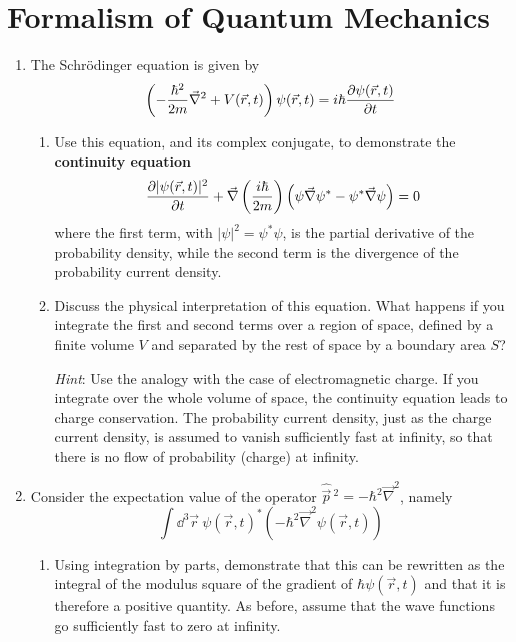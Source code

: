 \documentclass[../psets.tex]{subfiles}
\begin{document}
\section{Formalism of Quantum Mechanics}
\begin{enumerate}
    \item {}The Schr\"{o}dinger equation is given by
    \begin{equation*}
        \left( -\frac{\hbar^2}{2m}\vec{\nabla}^2+V(\vec{r},t) \right)\psi(\vec{r},t) = i\hbar\pdv{\psi(\vec{r},t)}{t}
    \end{equation*}
    \begin{enumerate}
        \item Use this equation, and its complex conjugate, to demonstrate the \textbf{continuity equation}
        \begin{equation*}
            \pdv{|\psi(\vec{r},t)|^2}{t}+\vec{\nabla}\left( \frac{i\hbar}{2m} \right)\left( \psi\vec{\nabla}\psi^*-\psi^*\vec{\nabla}\psi \right) = 0
        \end{equation*}
        where the first term, with $|\psi|^2=\psi^*\psi$, is the partial derivative of the probability density, while the second term is the divergence of the probability current density.
        \item Discuss the physical interpretation of this equation. What happens if you integrate the first and second terms over a region of space, defined by a finite volume $V$ and separated by the rest of space by a boundary area $S$?\par
        \emph{Hint}: Use the analogy with the case of electromagnetic charge. If you integrate over the whole volume of space, the continuity equation leads to charge conservation. The probability current density, just as the charge current density, is assumed to vanish sufficiently fast at infinity, so that there is no ﬂow of probability (charge) at infinity.
    \end{enumerate}
    \item Consider the expectation value of the operator $\hat{\vec{p}}{\,}^2=-\hbar^2\vec{\nabla}^2$, namely
    \begin{equation*}
        \int\dd^3\vec{r}\ \psi(\vec{r},t)^*\left( -\hbar^2\vec{\nabla}^2\psi(\vec{r},t) \right)
    \end{equation*}
    \begin{enumerate}
        \item Using integration by parts, demonstrate that this can be rewritten as the integral of the modulus square of the gradient of $\hbar\psi(\vec{r},t)$ and that it is therefore a positive quantity. As before, assume that the wave functions go sufficiently fast to zero at infinity.

\end{enumerate}
\end{enumerate}
\end{document}
